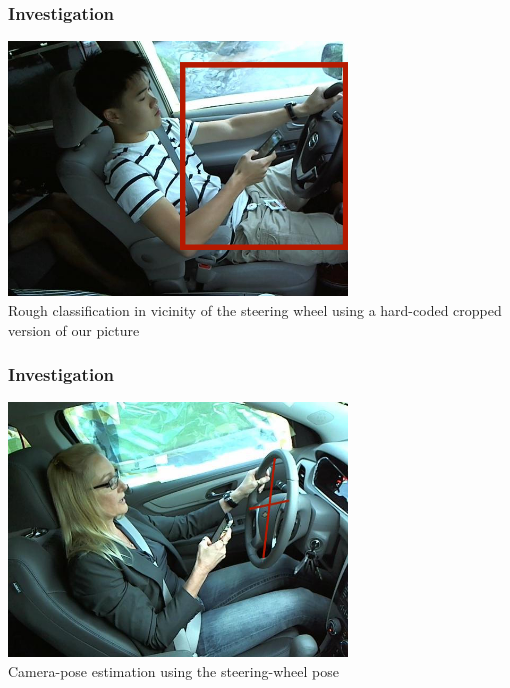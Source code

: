 \documentclass{beamer}
\begin{document}
    \begin{frame}
		\frametitle{Investigation}
        \begin{center}
        \includegraphics[width=9cm]{images/HandLocalisation.jpg}\\
        Rough classification in vicinity of the steering wheel using a hard-coded cropped version of our picture\end{center}
    \end{frame}


    \begin{frame}
		\frametitle{Investigation}
        \begin{center}
        \includegraphics[width=9cm]{images/CameraPose.jpg}\\
        Camera-pose estimation using the steering-wheel pose\end{center}
    \end{frame}
\end{document}
